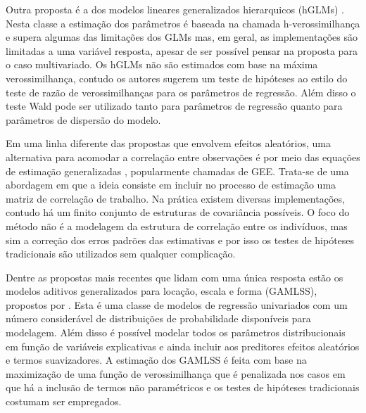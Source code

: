 
Outra proposta é a dos modelos lineares generalizados hierarquicos (hGLMs) \citep{lee1996hierarchical}. Nesta classe a estimação dos parâmetros é baseada na chamada h-verossimilhança e supera algumas das limitações dos GLMs mas, em geral, as implementações são limitadas a uma variável resposta, apesar de ser possível pensar na proposta para o caso multivariado. Os hGLMs não são estimados com base na máxima verossimilhança, contudo os autores sugerem um teste de hipóteses ao estilo do teste de razão de verossimilhanças para os parâmetros de regressão. Além disso o teste Wald pode ser utilizado tanto para parâmetros de regressão quanto para parâmetros de dispersão do modelo.


Em uma linha diferente das propostas que envolvem efeitos aleatórios, uma alternativa para acomodar a correlação entre observações é por meio das equações de estimação generalizadas \citep{Liang86}, popularmente chamadas de GEE. Trata-se de uma abordagem em que a ideia consiste em incluir no processo de estimação uma matriz de correlação de trabalho. Na prática existem diversas implementações, contudo há um finito conjunto de estruturas de covariância possíveis. O foco do método não é a modelagem da estrutura de correlação entre os indivíduos, mas sim a correção dos erros padrões das estimativas e por isso os testes de hipóteses tradicionais são utilizados sem qualquer complicação.


Dentre as propostas mais recentes que lidam com uma única resposta estão os modelos aditivos generalizados para locação, escala e forma (GAMLSS), propostos por \citet{stasinopoulos2008generalized}. Esta é uma classe de modelos de regressão univariados com um número considerável de distribuições de probabilidade disponíveis para modelagem. Além disso é possível modelar todos os parâmetros distribucionais em função de variáveis explicativas e ainda incluir aos preditores efeitos aleatórios e termos suavizadores. A estimação dos GAMLSS é feita com base na maximização de uma função de verossimilhança que é penalizada nos casos em que há a inclusão de termos não paramétricos e os testes de hipóteses tradicionais costumam ser empregados.


